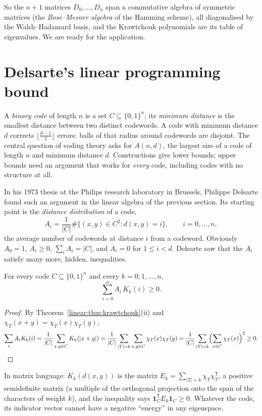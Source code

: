 So the $n+1$ matrices $D_0,\dots,D_n$ span a commutative algebra of symmetric matrices (the \emph{Bose--Mesner algebra} of the
Hamming scheme), all diagonalised by the Walsh--Hadamard basis, and the Krawtchouk polynomials are its table of eigenvalues. We
are ready for the application.

\section{Delsarte's linear programming bound}

A \emph{binary code} of length $n$ is a set $C\subseteq\{0,1\}^n$; its \emph{minimum distance} is the smallest distance between two
distinct codewords. A code with minimum distance $d$ corrects $\lfloor\frac{d-1}2\rfloor$ errors: balls of that radius around
codewords are disjoint. The central question of coding theory asks for $A(n,d)$, the largest size of a code of length $n$ and
minimum distance $d$. Constructions give lower bounds; upper bounds need an argument that works for \emph{every} code, including
codes with no structure at all.

In his 1973 thesis at the Philips research laboratory in Brussels, Philippe Delsarte found such an argument in the linear
algebra of the previous section. Its starting point is the \emph{distance distribution} of a code,
\[
A_i=\frac1{|C|}\#\{(x,y)\in C^2:d(x,y)=i\},\qquad i=0,\dots,n,
\]
the average number of codewords at distance $i$ from a codeword. Obviously $A_0=1$, $A_i\ge0$, $\sum_iA_i=|C|$, and $A_i=0$ for
$1\le i<d$. Delsarte saw that the $A_i$ satisfy many more, hidden, inequalities.

\begin{theorem}[Delsarte, 1973]\label{linear:thm:delsarte}
For every code $C\subseteq\{0,1\}^n$ and every $k=0,1,\dots,n$,
\[
\sum_{i=0}^nA_i\,K_k(i)\ge0.
\]
\end{theorem}
\begin{proof}
By Theorem~\ref{linear:thm:krawtchouk}(ii) and $\chi_T(x+y)=\chi_T(x)\chi_T(y)$,
\[
\sum_iA_iK_k(i)=\frac1{|C|}\sum_{x,y\in C}K_k(|x+y|)=\frac1{|C|}\sum_{|T|=k}\sum_{x,y\in C}\chi_T(x)\chi_T(y)
=\frac1{|C|}\sum_{|T|=k}\Bigl(\sum_{x\in C}\chi_T(x)\Bigr)^2\ge0.
\]
\end{proof}

In matrix language: $K_k(d(x,y))$ is the matrix $E_k=\sum_{|T|=k}\chi_T\chi_T^{\mathsf T}$, a positive semidefinite matrix (a multiple of
the orthogonal projection onto the span of the characters of weight $k$), and the inequality says $\mathbf 1_C^{\mathsf T}E_k\mathbf
1_C\ge0$. Whatever the code, its indicator vector cannot have a negative ``energy'' in any eigenspace.

